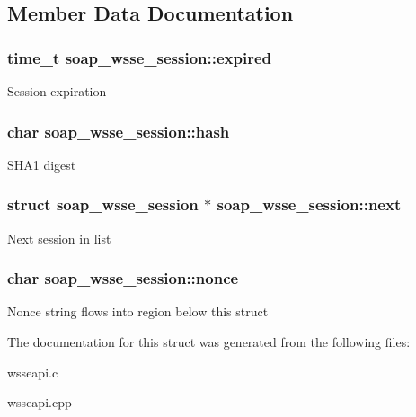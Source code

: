 \subsection{Member Data Documentation}
\hypertarget{structsoap__wsse__session_a0f424c1e05edb26c5e20426b3ab34d07}{
\subsubsection[{expired}]{\setlength{\rightskip}{0pt plus 5cm}time\_\-t {\bf soap\_\-wsse\_\-session::expired}}}
\label{structsoap__wsse__session_a0f424c1e05edb26c5e20426b3ab34d07}
Session expiration \hypertarget{structsoap__wsse__session_ad444a70e5ed626a29bc9559e6e8c24ff}{
\subsubsection[{hash}]{\setlength{\rightskip}{0pt plus 5cm}char {\bf soap\_\-wsse\_\-session::hash}}}
\label{structsoap__wsse__session_ad444a70e5ed626a29bc9559e6e8c24ff}
SHA1 digest \hypertarget{structsoap__wsse__session_a5a118c7373f552f689bdf25bb0b9ad51}{
\subsubsection[{next}]{\setlength{\rightskip}{0pt plus 5cm}struct {\bf soap\_\-wsse\_\-session} $\ast$ {\bf soap\_\-wsse\_\-session::next}}}
\label{structsoap__wsse__session_a5a118c7373f552f689bdf25bb0b9ad51}
Next session in list \hypertarget{structsoap__wsse__session_a840c2bd53ec4409fb6f355d2adbe16f8}{
\subsubsection[{nonce}]{\setlength{\rightskip}{0pt plus 5cm}char {\bf soap\_\-wsse\_\-session::nonce}}}
\label{structsoap__wsse__session_a840c2bd53ec4409fb6f355d2adbe16f8}
Nonce string flows into region below this struct 

The documentation for this struct was generated from the following files:\begin{DoxyCompactItemize}
\item 
wsseapi.c\item 
wsseapi.cpp\end{DoxyCompactItemize}
